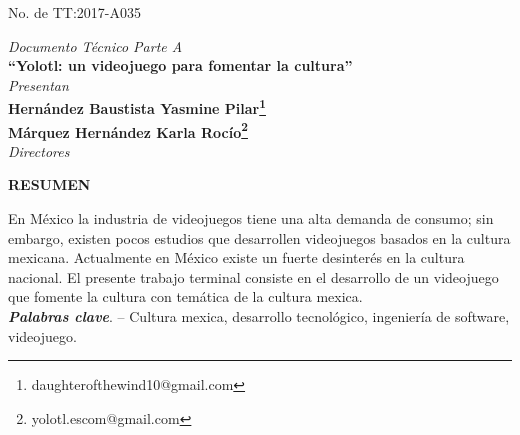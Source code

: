 	\begin{center}
	    
	    
\begin{multicols}{2} 
\raggedright{{\fontsize{14}{20} No. de TT:2017-A035}} 

\end{multicols}\vspace{1cm}

	    {\fontsize{14}{20} \textit{Documento Técnico Parte A}}\vspace{1cm}\\
	    {\fontsize{16}{20} \textbf{``Yolotl: un videojuego para fomentar la cultura''}}\vspace{1.5cm}\\
	    {\fontsize{14}{20} \textit{Presentan}}\\
	    {\fontsize{14}{20} \textbf{Hernández Baustista Yasmine Pilar\footnote{daughterofthewind10@gmail.com}}}\vspace{1cm}\\
	    {\fontsize{14}{20} \textbf{Márquez Hernández Karla Rocío\footnote{yolotl.escom@gmail.com}}}\vspace{1cm}\\
	   
	   \fontsize{14}{20} \textit{Directores}\vspace{1.5cm}\\
	    
	    
{\fboxrule=0pt \fboxsep=12pt	    
}
\end{center}
\begin{center}
{\fontsize{14}{20} \textbf{RESUMEN}}
\end{center}
En México la industria de videojuegos tiene una alta demanda de consumo; sin embargo, existen pocos estudios que desarrollen videojuegos basados en la cultura mexicana. Actualmente en México existe un fuerte desinterés en la cultura nacional. El presente trabajo terminal consiste en el desarrollo de un videojuego que fomente la cultura con temática de la cultura mexica. 
\\
 
\textbf{\textit{Palabras clave}}. –  Cultura mexica, desarrollo tecnológico, ingeniería de software, videojuego.
